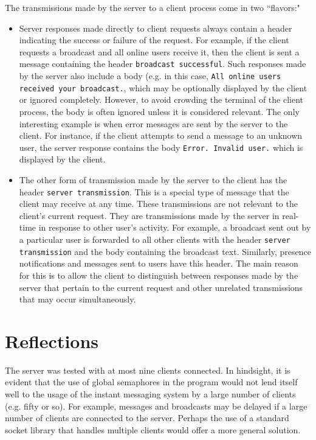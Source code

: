 \documentclass[12pt,a4paper]{article}
\begin{document}
The transmissions made by the server to a client process come in two ``flavors:"
\begin{itemize}
	\item Server responses made directly to client requests always contain a header indicating the success or failure of the request. For example, if the client requests a broadcast and all online users receive it, then the client is sent a message containing the header \verb|broadcast successful|. Such responses made by the server also include a body (e.g. in this case, \verb|All online users received your broadcast.|, which may be optionally displayed by the client or ignored completely. However, to avoid crowding the terminal of the client process, the body is often ignored unless it is considered relevant. The only interesting example is when error messages are sent by the server to the client. For instance, if the client attempts to send a message to an unknown user, the server response contains the body \verb|Error. Invalid user.| which is displayed by the client.

	\clearpage

	\item The other form of transmission made by the server to the client has the header \verb|server transmission|. This is a special type of message that the client may receive at any time. These transmissions are not relevant to the client's current request. They are transmissions made by the server in real-time in response to other user's activity. For example, a broadcast sent out by a particular user is forwarded to all other clients with the header \verb|server transmission| and the body containing the broadcast text. Similarly, presence notifications and messages sent to users have this header. The main reason for this is to allow the client to distinguish between responses made by the server that pertain to the current request and other unrelated transmissions that may occur simultaneously.
\end{itemize}

\section{Reflections}
\label{sec:reflections}

The server was tested with at most nine clients connected. In hindsight, it is evident that the use of global semaphores in the program would not lend itself well to the usage of the instant messaging system by a large number of clients (e.g. fifty or so). For example, messages and broadcasts may be delayed if a large number of clients are connected to the server. Perhaps the use of a standard socket library that handles multiple clients would offer a more general solution.
\end{document}
